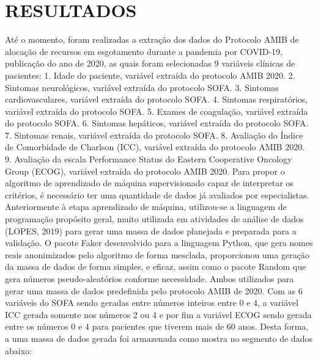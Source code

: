 \documentclass[12pt]{article}
\begin{document}
\section{RESULTADOS}

Até o momento, foram realizadas a extração dos dados do Protocolo AMIB de alocação de recursos em esgotamento durante a pandemia por COVID-19, publicação do ano de 2020, as quais foram selecionadas 9 variáveis clínicas de pacientes:
1.	Idade do paciente, variável extraída do protocolo AMIB 2020.
2.	Sintomas neurológicos, variável extraída do protocolo SOFA.
3.	Sintomas cardiovasculares, variável extraída do protocolo SOFA.
4.	Sintomas respiratórios, variável extraída do protocolo SOFA.
5.	Exames de coagulação, variável extraída do protocolo SOFA.
6.	Sintomas hepáticos, variável extraída do protocolo SOFA.
7.	Sintomas renais, variável extraída do protocolo SOFA.
8.	Avaliação do Índice de Comorbidade de Charlson (ICC), variável extraída do protocolo AMIB 2020.
9.	Avaliação da escala Performance Status do Eastern Cooperative Oncology Group (ECOG), variável extraída do protocolo AMIB 2020.
Para propor o algoritmo de aprendizado de máquina supervisionado capaz de interpretar os critérios, é necessário ter uma quantidade de dados já avaliados por especialistas. Anteriormente à etapa aprendizado de máquina, utilizou-se a linguagem de programação propósito geral, muito utilizada em atividades de análise de dados (LOPES, 2019) para gerar uma massa de dados planejada e preparada para a validação.
O pacote Faker desenvolvido para a linguagem Python, que gera nomes reais anonimizados pelo algoritmo de forma mesclada, proporcionou uma geração da massa de dados de forma simples, e eficaz, assim como o pacote Random que gera números pseudo-aleatórios conforme necessidade. Ambos utilizados para gerar uma massa de dados predefinida pelo protocolo AMIB de 2020.
Com as 6 variáveis do SOFA sendo geradas entre números inteiros entre 0 e 4, a variável ICC gerada somente nos números 2 ou 4 e por fim a variável ECOG sendo gerada entre os números 0 e 4 para pacientes que tiverem mais de 60 anos. Desta forma, a uma massa de dados gerada foi armazenada como mostra no segmento de dados abaixo:
\end{document}

